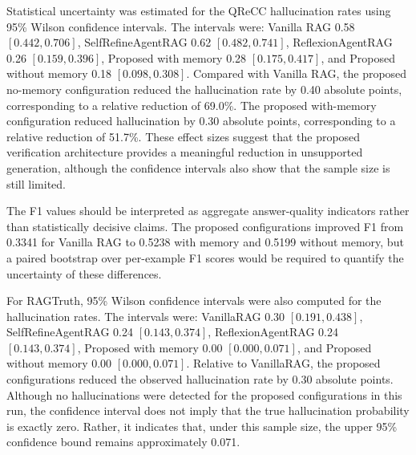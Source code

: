Statistical uncertainty was estimated for the QReCC hallucination rates using
95\% Wilson confidence intervals. The intervals were: Vanilla RAG 0.58
\([0.442, 0.706]\), SelfRefineAgentRAG 0.62 \([0.482, 0.741]\),
ReflexionAgentRAG 0.26 \([0.159, 0.396]\), Proposed with memory 0.28
\([0.175, 0.417]\), and Proposed without memory 0.18 \([0.098, 0.308]\).
Compared with Vanilla RAG, the proposed no-memory configuration reduced the
hallucination rate by 0.40 absolute points, corresponding to a relative reduction of
69.0\%. The proposed with-memory configuration reduced hallucination by 0.30
absolute points, corresponding to a relative reduction of 51.7\%. These effect sizes
suggest that the proposed verification architecture provides a meaningful reduction
in unsupported generation, although the confidence intervals also show that the
sample size is still limited.

The F1 values should be interpreted as aggregate answer-quality indicators rather
than statistically decisive claims. The proposed configurations improved F1 from
0.3341 for Vanilla RAG to 0.5238 with memory and 0.5199 without memory, but
a paired bootstrap over per-example F1 scores would be required to quantify the
uncertainty of these differences.

For RAGTruth, 95\% Wilson confidence intervals were also computed for the
hallucination rates. The intervals were: VanillaRAG 0.30 \([0.191, 0.438]\),
SelfRefineAgentRAG 0.24 \([0.143, 0.374]\), ReflexionAgentRAG 0.24
\([0.143, 0.374]\), Proposed with memory 0.00 \([0.000, 0.071]\), and
Proposed without memory 0.00 \([0.000, 0.071]\). Relative to VanillaRAG, the
proposed configurations reduced the observed hallucination rate by 0.30 absolute
points. Although no hallucinations were detected for the proposed configurations
in this run, the confidence interval does not imply that the true hallucination
probability is exactly zero. Rather, it indicates that, under this sample size, the
upper 95\% confidence bound remains approximately 0.071.

